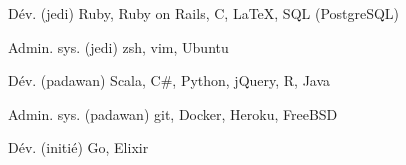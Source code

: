 
\begin{cvskills}

  \cvskill
    {Dév. (jedi)} %
    {Ruby, Ruby on Rails, C, LaTeX, SQL (PostgreSQL)} %

  \cvskill
    {Admin. sys. (jedi)} %
    {zsh, vim, Ubuntu} %

  \cvskill
    {Dév. (padawan)} %
    {Scala, C\#, Python, jQuery, R, Java} %

  \cvskill
    {Admin. sys. (padawan)} %
    {git, Docker, Heroku, FreeBSD} %

  \cvskill
    {Dév. (initié)} %
    {Go, Elixir} %
\end{cvskills}
